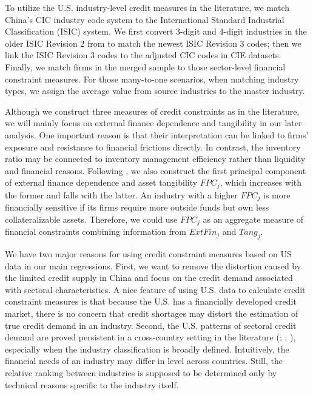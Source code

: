 \documentclass[12pt]{article}
\begin{document}
To utilize the U.S. industry-level credit measures in the literature, we match China's CIC industry code system to the International Standard Industrial Classification (ISIC) system. We first convert 3-digit and 4-digit industries in the older ISIC Revision 2 from \cite{manova-wei-zhang2015} to match the newest ISIC Revision 3 codes; then we link the ISIC Revision 3 codes to the adjusted CIC codes in CIE datasets. Finally, we match firms in the merged sample to those sector-level financial constraint measures. For those many-to-one scenarios, when matching industry types, we assign the average value from source industries to the master industry.

Although we construct three measures of credit constraints as in the literature, we will mainly focus on external finance dependence and tangibility in our later analysis. One important reason is that their interpretation can be linked to firms' exposure and resistance to financial frictions directly. In contrast, the inventory ratio may be connected to inventory management efficiency rather than liquidity and financial reasons. Following \cite{manova-wei-zhang2015}, we also construct the first principal component of external finance dependence and asset tangibility $FPC_j$, which increases with the former and falls with the latter. An industry with a higher $FPC_j$ is more financially sensitive if its firms require more outside funds but own less collateralizable assets. Therefore, we could use $FPC_j$ as an aggregate measure of financial constraints combining information from $ExtFin_j$ and $Tang_j$.

We have two major reasons for using credit constraint measures based on US data in our main regressions. First, we want to remove the distortion caused by the limited credit supply in China and focus on the credit demand associated with sectoral characteristics. A nice feature of using U.S. data to calculate credit constraint measures is that because the U.S. has a financially developed credit market, there is no concern that credit shortages may distort the estimation of true credit demand in an industry. Second, the U.S. patterns of sectoral credit demand are proved persistent in a cross-country setting in the literature (\cite{kroszner2007}; \cite{manova-wei-zhang2015}; \cite{fan-lai-li2015}), especially when the industry classification is broadly defined. Intuitively, the financial needs of an industry may differ in level across countries. Still, the relative ranking between industries is supposed to be determined only by technical reasons specific to the industry itself.
\end{document}
